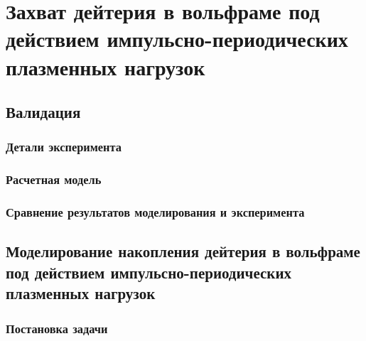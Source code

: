 \chapter{Захват дейтерия в вольфраме под действием импульсно-периодических плазменных нагрузок}\label{ch:ch3}

\section{Валидация}\label{sec:ch3/sec1}
\subsection{Детали эксперимента}\label{sec:ch3/sec1/subsec1}
\subsection{Расчетная модель}\label{sec:ch3/sec1/subsec2}
\subsection{Сравнение результатов моделирования и эксперимента}\label{sec:ch3/sec1/subsec3}


\section{Моделирование накопления дейтерия в вольфраме под действием импульсно-периодических плазменных нагрузок}\label{sec:ch3/sec2}
\subsection{Постановка задачи}\label{sec:ch3/sec2/subsec1}
